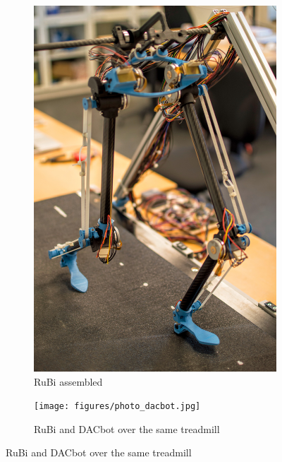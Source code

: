 \begin{figure}[ht!]
    \centering
    \begin{subfigure}[b]{0.49\textwidth}
        \includegraphics[width=\textwidth]{figures/photo_robot_walking.jpg}
        \caption{RuBi assembled}
        \label{fig:photo_robot_walking}
    \end{subfigure}
    \begin{subfigure}[b]{0.49\textwidth}
        \texttt{[image: figures/photo\_dacbot.jpg]}
        \caption{RuBi and DACbot over the same treadmill}
        \label{fig:photo_dacbot}
    \end{subfigure}
\end{figure}    
